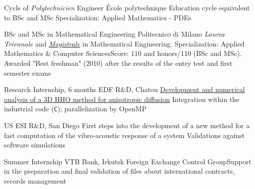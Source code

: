 \documentclass[english]{RMcv}
\begin{document}


%
%
        {Cycle of \textit{Polytechnicien} Engineer}%
        {\'Ecole polytechnique}%
        {Education cycle equivalent to BSc and MSc}%
        {Specialization: Applied Mathematics - PDEs}


%
%
        {BSc and MSc in Mathematical Engineering}%
        {Politecnico di Milano}%
        {\emph{Laurea Triennale} and \href{https://www.politesi.polimi.it/handle/10589/133692}{\emph{Magistrale}} in Mathematical Engineering. Specialization: Applied Mathematics \& Computer Sciences}{Score: 110 and honors/110 (BSc and MSc). Awarded "Best freshman" (2010) after the results of the entry test and first semester exams}

\vspace{8pt}


%
%
        {Research Internship, 6 months}%
        {EDF R\&D, Chatou}%
        {\href{https://www.politesi.polimi.it/handle/10589/133692}{Development and numerical analysis of a 3D HHO method for anisotropic diffusion}}%
        {Integration within the industrial code \cs{} (\texttt{C}); parallelization by OpenMP}


%
%
        {US ESI R\&D, San Diego}%
        {First steps into the development of a new method for a fast computation of the vibro-acoustic response of a system}%
        {Validations against software simulations}


%
%
        {Summer Internship}%
        {VTB Bank, Irkutsk}%
        {Foreign Exchange Control Group}{Support in the preparation and final validation of files about international contracts, records management}
\end{document}
